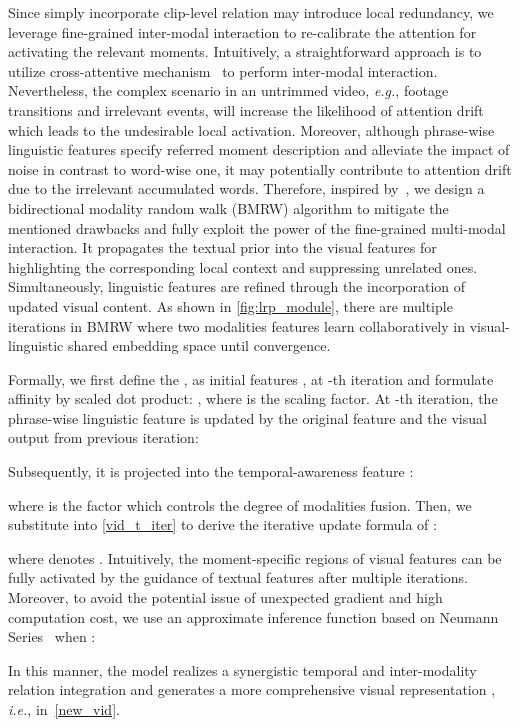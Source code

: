 \documentclass[10pt,twocolumn,letterpaper]{article}
\begin{document}
Since simply incorporate clip-level relation may introduce local redundancy, we leverage fine-grained inter-modal interaction to re-calibrate the attention for activating the relevant moments. 
Intuitively, a straightforward approach is to utilize cross-attentive mechanism~\cite{qddetr, umt} to perform inter-modal interaction.
Nevertheless, the complex scenario in an untrimmed video, \textit{e.g.}, footage transitions and irrelevant events, will increase the likelihood of attention drift which leads to the undesirable local activation.
Moreover, although phrase-wise linguistic features specify referred moment description and alleviate the impact of noise in contrast to word-wise one, it may potentially contribute to attention drift due to the irrelevant accumulated words.
Therefore, inspired by~\cite{rskp,Giannis2020,Grady2006}, we design a  
bidirectional modality random walk (BMRW) algorithm to mitigate the mentioned drawbacks and fully exploit the power of the fine-grained multi-modal interaction.
It propagates the textual prior into the visual features for highlighting the corresponding local context and suppressing unrelated ones.
Simultaneously, linguistic features are refined through the incorporation of updated visual content. 
As shown in \cref{fig:lrp_module}, there are multiple iterations in BMRW where two modalities features learn collaboratively in visual-linguistic shared embedding space until convergence.

Formally, we first define the ,  as initial features ,  at -th iteration and formulate affinity  by scaled dot product: , where  is the scaling factor.
At -th iteration, the phrase-wise linguistic feature  is updated by the original feature  and the visual output  from previous iteration: 

Subsequently, it is projected into the temporal-awareness feature :

where  is the factor which controls the degree of modalities fusion.
Then, we substitute  into \cref{vid_t_iter} to derive the iterative update formula of :

where  denotes . Intuitively, the moment-specific regions of visual features can be fully activated by the guidance of textual features after multiple iterations.
Moreover, to avoid the potential issue of unexpected gradient and high computation cost, we use an approximate inference function based on Neumann Series~\cite{neuman} when :


In this manner, the model realizes a synergistic temporal and inter-modality relation integration and generates a more comprehensive visual representation , \textit{i.e.},  in~\cref{new_vid}.
\end{document}
